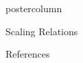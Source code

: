 \documentclass{beamer}
\begin{document}
\begin{frame}
\begin{columns}
\begin{column}{.5\textwidth}
\begin{beamercolorbox}[center,wd=\textwidth]{postercolumn}
\begin{minipage}[T]{.95\textwidth}
{\begin{myblock}{\LARGE Scaling Relations}
					\end{myblock}\vfill
					\begin{myblock}{\LARGE References}
						\footnotesize
						
						
					\end{myblock}\vfill
		}\end{minipage}\end{beamercolorbox}
	\end{column}
\end{columns}
\end{frame}
\end{document}

